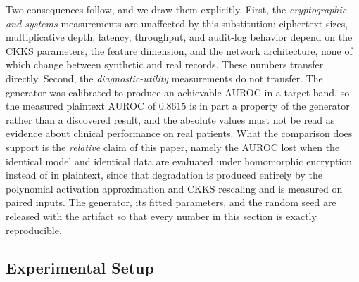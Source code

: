 \documentclass[journal,compsoc]{IEEEtran}
\begin{document}
Two consequences follow, and we draw them explicitly. First, the
\emph{cryptographic and systems} measurements are unaffected by this
substitution: ciphertext sizes, multiplicative depth, latency, throughput, and
audit-log behavior depend on the CKKS parameters, the feature dimension, and
the network architecture, none of which change between synthetic and real
records. These numbers transfer directly. Second, the \emph{diagnostic-utility}
measurements do not transfer. The generator was calibrated to produce an
achievable AUROC in a target band, so the measured plaintext AUROC of $0.8615$
is in part a property of the generator rather than a discovered result, and the absolute
values must not be read as evidence about clinical performance on real
patients. What the comparison does support is the \emph{relative} claim of this
paper, namely the AUROC lost when the identical model and identical data are
evaluated under homomorphic encryption instead of in plaintext, since that
degradation is produced entirely by the polynomial activation approximation and
CKKS rescaling and is measured on paired inputs. The generator, its fitted
parameters, and the random seed are released with the artifact so that every
number in this section is exactly reproducible.

\subsection{Experimental Setup}
\end{document}
